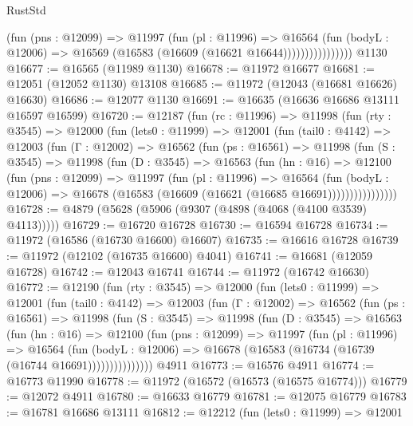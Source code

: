 \begin{lexlean}{RustStd}
\begin{coremodule}
                        (fun (pns : @12099) =>
                        @11997
                          (fun (pl : @11996) =>
                          @16564
                            (fun (bodyL : @12006) =>
                            @16569 (@16583 (@16609 (@16621 @16644))))))))))))))))
    @1130
@16677 := @16565 (@11989 @1130)
@16678 := @11972 @16677
@16681 := @12051 (@12052 @1130) @13108
@16685 := @11972 (@12043 (@16681 @16626) @16630)
@16686 := @12077 @1130
@16691 := @16635 (@16636 @16686 @13111 @16597 @16599)
@16720 := @12187
    (fun (rc : @11996) =>
    @11998
      (fun (rty : @3545) =>
      @12000
        (fun (lets0 : @11999) =>
        @12001
          (fun (tail0 : @4142) =>
          @12003
            (fun (Γ : @12002) =>
            @16562
              (fun (ps : @16561) =>
              @11998
                (fun (S : @3545) =>
                @11998
                  (fun (D : @3545) =>
                  @16563
                    (fun (hn : @16) =>
                    @12100
                      (fun (pns : @12099) =>
                      @11997
                        (fun (pl : @11996) =>
                        @16564
                          (fun (bodyL : @12006) =>
                          @16678 (@16583 (@16609 (@16621 (@16685 @16691))))))))))))))))
@16728 := @4879 (@5628 (@5906 (@9307 (@4898 (@4068 (@4100 @3539) @4113)))))
@16729 := @16720 @16728
@16730 := @16594 @16728
@16734 := @11972 (@16586 (@16730 @16600) @16607)
@16735 := @16616 @16728
@16739 := @11972 (@12102 (@16735 @16600) @4041)
@16741 := @16681 (@12059 @16728)
@16742 := @12043 @16741
@16744 := @11972 (@16742 @16630)
@16772 := @12190
    (fun (rty : @3545) =>
    @12000
      (fun (lets0 : @11999) =>
      @12001
        (fun (tail0 : @4142) =>
        @12003
          (fun (Γ : @12002) =>
          @16562
            (fun (ps : @16561) =>
            @11998
              (fun (S : @3545) =>
              @11998
                (fun (D : @3545) =>
                @16563
                  (fun (hn : @16) =>
                  @12100
                    (fun (pns : @12099) =>
                    @11997
                      (fun (pl : @11996) =>
                      @16564
                        (fun (bodyL : @12006) =>
                        @16678 (@16583 (@16734 (@16739 (@16744 @16691)))))))))))))))
    @4911
@16773 := @16576 @4911
@16774 := @16773 @11990
@16778 := @11972 (@16572 (@16573 (@16575 @16774)))
@16779 := @12072 @4911
@16780 := @16633 @16779
@16781 := @12075 @16779
@16783 := @16781 @16686 @13111
@16812 := @12212
    (fun (lets0 : @11999) =>
    @12001

\end{coremodule}
\end{lexlean}
